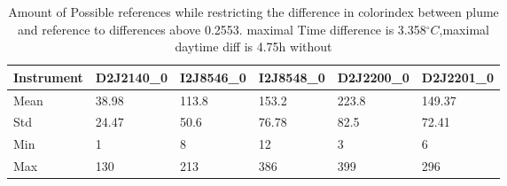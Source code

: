 \documentclass  [
  paper    = a4,
  BCOR     = 10mm,
  twoside,
  fontsize = 12pt,
  fleqn,
  toc      = bibnumbered,
  toc      = listofnumbered,
  numbers  = noendperiod,
  headings = normal,
  listof   = leveldown,
  version  = 3.03
]                                       {scrreprt}
\begin{document}
	\begin{table}
	\begin{tabular}{|p{2cm}|p{2cm}|p{2cm}|p{2cm}|p{2cm}|p{2cm}|}
		Instrument	&D2J2140\_0&I2J8546\_0& I2J8548\_0&D2J2200\_0&D2J2201\_0\\
		\toprule
		Mean&38.98&113.8&153.2&223.8&149.37\\
		\midrule
		Std&
		24.47&
		50.6&
		76.78&
		82.5&
		72.41\\
		\midrule
		Min&1&8&12&3 &6\\
		\midrule
		Max&130&213&386&399 &296\\
		\bottomrule
	\end{tabular}
	\caption{Amount of Possible references while restricting the difference in colorindex  between plume and reference to differences above 0.2553. maximal Time difference is 3.358$^{\circ}C$,maximal daytime diff is 4.75h without}
\end{table}	
\end{document}
